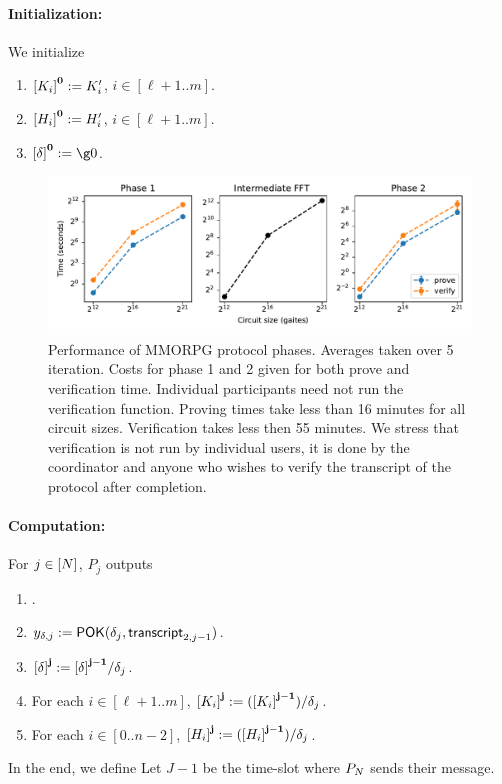 \documentclass{article}
\begin{document}
\paragraph{Initialization:}
We initialize
\begin{enumerate}
 \item ${{[{K_i}]}^{\mathbf{0}}} := K'_i$, $i\in[\ell+1..m]$.
 \item ${{[H_i]}^{\mathbf{0}}}:= H'_i$, $i\in[\ell+1..m]$.
 \item $\acc{\delta}{0}\defeq \g0$.

\end{enumerate}
\begin{figure}[t]
\includegraphics[width=\textwidth]{figure}
\centering
\caption{Performance of MMORPG protocol phases.  Averages taken over 5 iteration. Costs for phase 1 and 2 given for both prove and verification time. Individual participants need not run the verification function. Proving times take less than 16 minutes for all circuit sizes. Verification takes less then 55 minutes. We stress that verification is not run by individual users, it is done by the coordinator and anyone who wishes to verify the transcript of the protocol after completion.}
\label{fig:perf}
\end{figure}
\paragraph{Computation:}

For $j\in [N]$,
$P_j$ outputs
\begin{enumerate}
 \item {}.
 \item$ y_{\delta,j}:= \mathsf{POK}(\delta_j,\mathsf{transcript}_{2,j-1})$.

  \item ${{[\delta]}^{\mathbf{j}}}:= {{[\delta]}^{\mathbf{j-1}}}/\delta_j$.
 \item For each $i\in [\ell+1..m]$, ${{[K_i]}^{\mathbf{j}}}:= ({{[K_i]}^{\mathbf{j-1}}})/\delta_j$.
 \item For each $i\in [0..n-2]$, ${{[H_i]}^{\mathbf{j}}}:= ({{[H_i]}^{\mathbf{j-1}}})/\delta_j$.
\end{enumerate}
In the end, we define
Let $J-1$ be the time-slot where $P_N$ sends their message.
\end{document}
